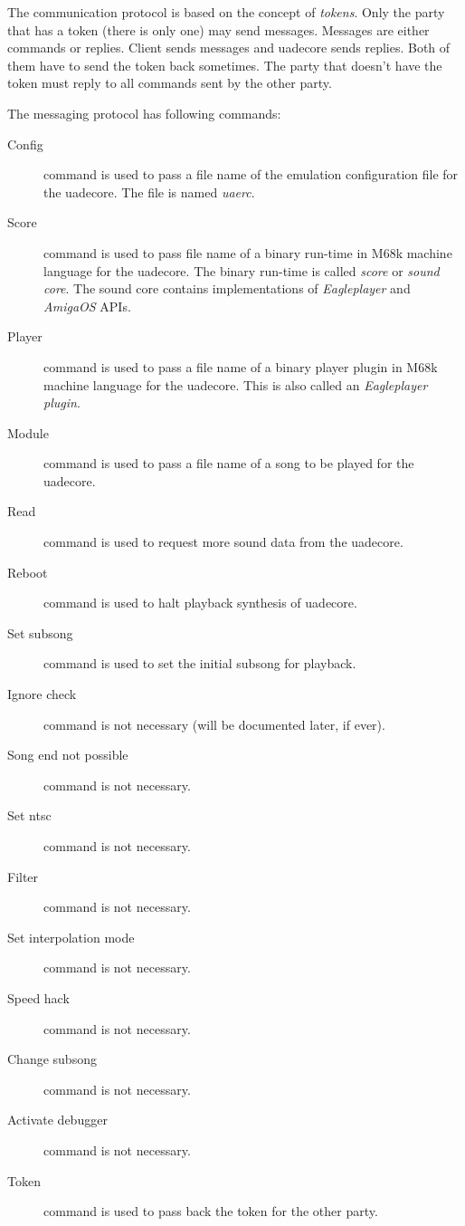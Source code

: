 \documentclass{article}
\begin{document}
The communication protocol is based on the concept of
\emph{tokens}. Only the party that has a token (there is only one) may
send messages. Messages are either commands or replies. Client sends
messages and uadecore sends replies. Both of them have to send the token back
sometimes. The party that doesn't have the token must reply to all commands
sent by the other party.

The messaging protocol has following commands:

\begin{description}
\item [Config] command is used to pass a file name of the emulation
configuration file for the uadecore. The file is named \emph{uaerc}.

\item [Score] command is used to pass file name of a binary run-time in M68k
machine language for the uadecore. The binary run-time is called
\emph{score} or \emph{sound core}. The sound core contains implementations of
\emph{Eagleplayer} and \emph{AmigaOS} APIs.

\item [Player] command is used to pass a file name of a binary player plugin
in M68k machine language for the uadecore. This is also called an
\emph{Eagleplayer plugin}.

\item [Module] command is used to pass a file name of a song to be played
for the uadecore.

\item [Read] command is used to request more sound data from the uadecore.

\item [Reboot] command is used to halt playback synthesis of uadecore.

\item [Set subsong] command is used to set the initial subsong for playback.

\item [Ignore check] command is not necessary (will be documented later,
if ever).
\item [Song end not possible] command is not necessary.
\item [Set ntsc] command is not necessary.
\item [Filter] command is not necessary.
\item [Set interpolation mode] command is not necessary.
\item [Speed hack] command is not necessary.
\item [Change subsong] command is not necessary.
\item [Activate debugger] command is not necessary.

\item [Token] command is used to pass back the token for the other party.

\end{description}
\end{document}
